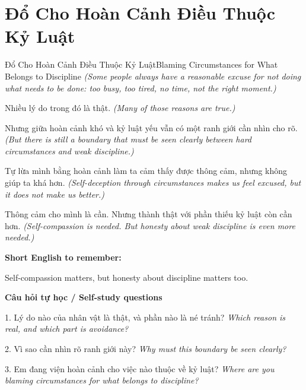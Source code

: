 \section{Đổ Cho Hoàn Cảnh Điều Thuộc Kỷ Luật}
\begin{truyen}{Đổ Cho Hoàn Cảnh Điều Thuộc Kỷ Luật}{Blaming Circumstances for What Belongs to Discipline}
\textit{(Some people always have a reasonable excuse for not doing what needs to be done: too busy, too tired, no time, not the right moment.)}

Nhiều lý do trong đó là thật.
\textit{(Many of those reasons are true.)}

Nhưng giữa hoàn cảnh khó và kỷ luật yếu vẫn có một ranh giới cần nhìn cho rõ.
\textit{(But there is still a boundary that must be seen clearly between hard circumstances and weak discipline.)}

Tự lừa mình bằng hoàn cảnh làm ta cảm thấy được thông cảm, nhưng không giúp ta khá hơn.
\textit{(Self-deception through circumstances makes us feel excused, but it does not make us better.)}

\end{truyen}

\begin{baihoc}
Thông cảm cho mình là cần. Nhưng thành thật với phần thiếu kỷ luật còn cần hơn.
\textit{(Self-compassion is needed. But honesty about weak discipline is even more needed.)}
\end{baihoc}

\begin{ghinhoanh}
\textbf{Short English to remember:}

Self-compassion matters, but honesty about discipline matters too.

\end{ghinhoanh}

\begin{tuhocnhanh}
\textbf{Câu hỏi tự học / Self-study questions}

1. Lý do nào của nhân vật là thật, và phần nào là né tránh? \textit{Which reason is real, and which part is avoidance?}

2. Vì sao cần nhìn rõ ranh giới này? \textit{Why must this boundary be seen clearly?}

3. Em đang viện hoàn cảnh cho việc nào thuộc về kỷ luật? \textit{Where are you blaming circumstances for what belongs to discipline?}
\end{tuhocnhanh}
\ngancach

